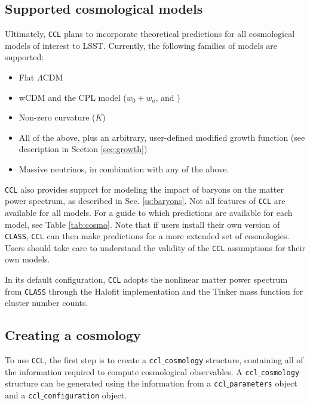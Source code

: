 \documentclass[\docopts]{\docclass}
\newcommand{\ccl}{{\tt CCL}\xspace}
\begin{document}



\subsection{Supported cosmological models}

\label{sec:cosmologies}
Ultimately, \ccl plans to incorporate theoretical predictions for all cosmological models of interest to LSST. Currently, the following families of models are supported:
\begin{itemize}
 \item Flat $\Lambda$CDM
 \item wCDM and the CPL model ($w_0+w_a$, \citealt{Chevallier01} and \citealt{Linder03})
 \item Non-zero curvature ($K$)
 \item All of the above, plus an arbitrary, user-defined modified growth function (see description in Section \ref{sec:growth})
  \item Massive neutrinos, in combination with any of the above.
\end{itemize}

\ccl also provides support for modeling the impact of baryons on the matter power spectrum, as described in Sec. \ref{ss:baryons}.
Not all features of \ccl are available for all models. For a guide to which predictions are available for each model, see Table \ref{tab:cosmo}. Note that if users install their own version of {\tt CLASS}, {\tt CCL} can then make predictions for a more extended set of cosmologies. Users should take care to understand the validity of the {\tt CCL} assumptions for their own models.

In its default configuration, \ccl adopts the nonlinear matter power spectrum from {\tt CLASS} through the Halofit implementation and the Tinker mass function for cluster number counts.

\subsection{Creating a cosmology}

To use \ccl, the first step is to create a {\tt ccl$\_$cosmology} structure, containing all of the information required to compute cosmological observables. A {\tt ccl$\_$cosmology} structure can be generated using the information from a {\tt ccl$\_$parameters} object and a {\tt ccl$\_$configuration} object.


\end{document}
